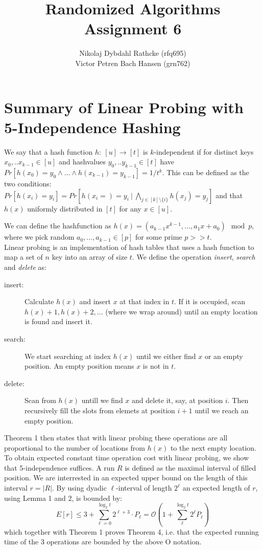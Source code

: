 \documentclass[a4paper, fleqn]{article}
\author{Nikolaj Dybdahl Rathcke (rfq695) \\ Victor Petren Bach Hansen (grn762)}
\title{Randomized Algorithms \\ Assignment 6}
\begin{document}
\maketitle

\section*{Summary of Linear Probing with 5-Independence Hashing}
We say that a hash function $h:\:[u]\rightarrow[t]$ is $k$-independent if for distinct keys $x_0,..x_{k-1}\in[u]$ and hashvalues $y_0,..y_{k-1}\in[t]$ have $ Pr[h(x_0)=y_0\land\ldots\land h(x_{k-1})=y_{k-1} ]=1/t^k$. This can be defined as the two conditions: $Pr[h(x_i)=y_i] = Pr[h(x_i=)=y_i\:|\: \bigwedge\limits_{j\in [k]\setminus \{i\}}h(x_j)=y_j]$ and that $h(x)$ uniformly distributed in $[t]$ for any $x \in [u]$.

We can define the hashfunction as $h(x)=(a_{k-1}x^{k-1}, \ldots, a_1x+a_0)\mod p$, where we pick random $a_0,\ldots, a_{k-1}\in [p]$ for some prime $p>>t$.\\

Linear probing is an implementation of hash tables that uses a hash function to map a set of $n$ key into an array of size $t$. We define the operation \textit{insert}, \textit{search} and \textit{delete} as:
\begin{description}
  \item[insert:] Calculate $h(x)$ and insert $x$ at that index in $t$. If it is occupied, scan $h(x)+1,h(x)+2,\ldots$ (where we wrap around) until an empty location is found and insert it.
  \item[search:] We start searching at index $h(x)$ until we either find $x$ or an empty position. An empty position means $x$ is not in $t$.
  \item[delete:] Scan from $h(x)$ untill we find $x$ and delete it, say, at position $i$. Then recursively fill the slots from elemets at position $i+1$ until we reach an empty position.
\end{description}
Theorem 1 then states that with linear probing these operations are all proportional to the number of locations from $h(x)$ to the next empty location.\\

To obtain expected constant time operation cost with linear probing, we show that 5-independence suffices. A run $R$ is defined as the maximal interval of filled position. We are interrested in an expected upper bound on the length of this interval $r=|R|$. By using dyadic $\ell$-interval of length $2^{\ell}$ an expected length of $r$, using Lemma 1 and 2, is bounded by:
$$
E[r] \leq 3 +\sum_{\ell=0}^{\log_2 t}2^{\ell+3}\cdot P_{\ell}=\mathcal{O}\left( 1 + \sum_{\ell}^{\log_2 t}2^{\ell}P_{\ell} \right)
$$
which together with Theorem 1 proves Theorem 4, i.e. that the expected running time of the 3 operations are bounded by the above O notation.\\
\end{document}

